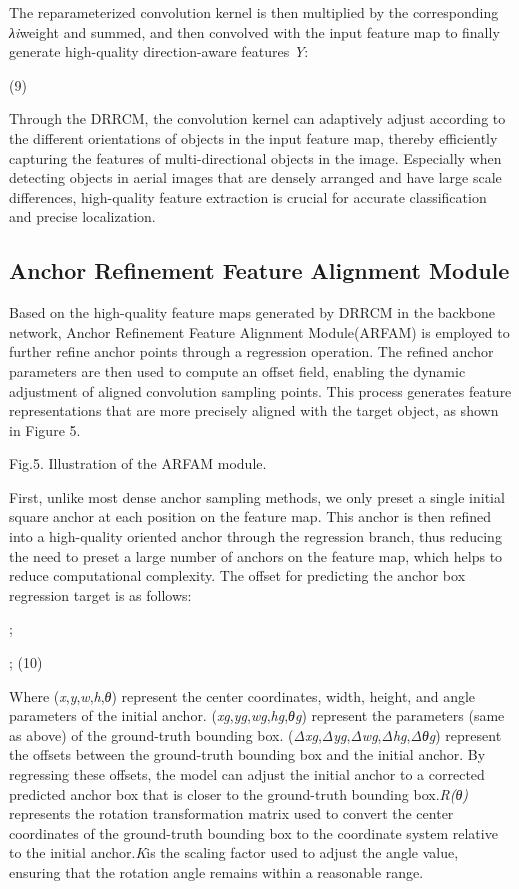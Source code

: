 \documentclass[10pt,twocolumn,final]{article}
\begin{document}
The reparameterized convolution kernel is then multiplied by the corresponding \textit{λ}\textit{i}weight and summed, and then convolved with the input feature map to finally generate high-quality direction-aware features \textit{Y}:

	(9)

Through the DRRCM, the convolution kernel can adaptively adjust according to the different orientations of objects in the input feature map, thereby efficiently capturing the features of multi-directional objects in the image. Especially when detecting objects in aerial images that are densely arranged and have large scale differences, high-quality feature extraction is crucial for accurate classification and precise localization.

\subsection{ Anchor Refinement Feature Alignment Module }

Based on the high-quality feature maps generated by DRRCM in the backbone network, Anchor Refinement Feature Alignment Module(ARFAM) is employed to further refine anchor points through a regression operation. The refined anchor parameters are then used to compute an offset field, enabling the dynamic adjustment of aligned convolution sampling points. This process generates feature representations that are more precisely aligned with the target object, as shown in Figure 5.

Fig.5. Illustration of the ARFAM module.

First, unlike most dense anchor sampling methods, we only preset a single initial square anchor at each position on the feature map. This anchor is then refined into a high-quality oriented anchor through the regression branch, thus reducing the need to preset a large number of anchors on the feature map, which helps to reduce computational complexity. The offset for predicting the anchor box regression target is as follows:

 ; 

 ; 	(10)

	Where (\textit{x},\textit{y},\textit{w},\textit{h},\textit{θ}) represent the center coordinates, width, height, and angle parameters of the initial anchor. (\textit{x}\textit{g},\textit{y}\textit{g},\textit{w}\textit{g},\textit{h}\textit{g},\textit{θ}\textit{g}) represent the parameters (same as above) of the ground-truth bounding box. (\textit{Δx}\textit{g},\textit{Δy}\textit{g},\textit{Δw}\textit{g},\textit{Δh}\textit{g},\textit{Δθ}\textit{g}) represent the offsets between the ground-truth bounding box and the initial anchor. By regressing these offsets, the model can adjust the initial anchor to a corrected predicted anchor box that is closer to the ground-truth bounding box.\textit{R(θ)} represents the rotation transformation matrix used to convert the center coordinates of the ground-truth bounding box to the coordinate system relative to the initial anchor.\textit{K}is the scaling factor used to adjust the angle value, ensuring that the rotation angle remains within a reasonable range.
\end{document}

